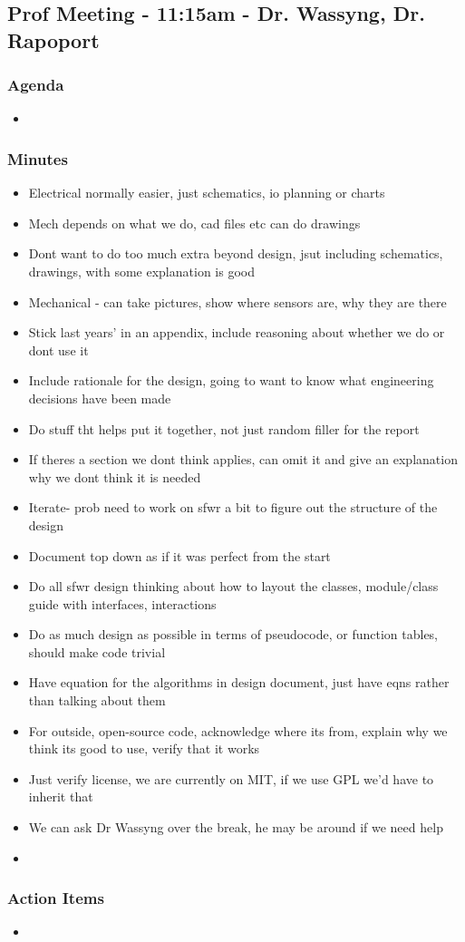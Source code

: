 	\subsection*{Prof Meeting - 11:15am - Dr. Wassyng, Dr. Rapoport}
		\subsubsection*{Agenda}
			\begin{itemize}
				\item 
			\end{itemize}

		\subsubsection*{Minutes}
			\begin{itemize}
				\item Electrical normally easier, just schematics, io planning or charts
				\item Mech depends on what we do, cad files etc can do drawings
				\item Dont want to do too much extra beyond design, jsut including schematics, drawings, with some explanation is good
				\item Mechanical - can take pictures, show where sensors are, why they are there
				\item Stick last years' in an appendix, include reasoning about whether we do or dont use it
				\item Include rationale for the design, going to want to know what engineering decisions have been made
				\item Do stuff tht helps put it together, not just random filler for the report 
				\item If theres a section we dont think applies, can omit it and give an explanation why we dont think it is needed 
				\item Iterate- prob need to work on sfwr a bit to figure out the structure of the design 
				\item Document top down as if it was perfect from the start 
				\item Do all sfwr design thinking about how to layout the classes, module/class guide with interfaces, interactions 
				\item Do as much design as possible in terms of pseudocode, or function tables, should make code trivial 
				\item Have equation for the algorithms in design document, just have eqns rather than talking about them 
				\item For outside, open-source code, acknowledge where its from, explain why we think its good to use, verify that it works
				\item Just verify license, we are currently on MIT, if we use GPL we'd have to inherit that 
				\item We can ask Dr Wassyng over the break, he may be around if we need help 
				\item 
			\end{itemize}

		\subsubsection*{Action Items}
			\begin{itemize}
				\item 
			\end{itemize}

